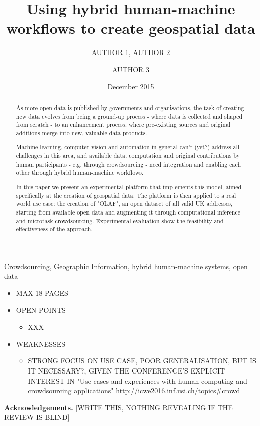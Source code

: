 \documentclass{llncs}
\title{Using hybrid human-machine workflows to create geospatial data}
\author{AUTHOR 1\inst{1}, AUTHOR 2\inst{1} \and AUTHOR 3\inst{2}}
\institute{INSTITUTE 1 \email{EMAIL FOR AUTHOR 1} \and INSTITUTE 2}
\date{December 2015}
\begin{document}
\maketitle

\begin{abstract}
As more open data is published by governments and organisations, the task of creating new data evolves from being a ground-up process - where data is collected and shaped from scratch - to an enhancement process, where pre-existing sources and original additions merge into new, valuable data products. 

Machine learning, computer vision and automation in general can't (yet?) address all challenges in this area, and available data, computation and original contributions by human participants - e.g. through crowdsourcing - need integration and enabling each other through hybrid human-machine workflows. 

In this paper we present an experimental platform that implements this model, aimed specifically at the creation of geospatial data. The platform is then applied to a real world use case: the creation of "OLAF", an open dataset of all valid UK addresses, starting from available open data and augmenting it through computational inference and microtask crowdsourcing. Experimental evaluation show the feasibility and effectiveness of the approach.
\end{abstract}

\begin{keywords}
Crowdsourcing, Geographic Information, hybrid human-machine systems, open data 
\end{keywords}

\begin{itemize}
    \item MAX 18 PAGES
    \item OPEN POINTS
        \begin{itemize}
            \item XXX
        \end{itemize}
    \item WEAKNESSES 
        \begin{itemize}
            \item STRONG FOCUS ON USE CASE, POOR GENERALISATION, BUT IS IT NECESSARY?, GIVEN THE CONFERENCE'S EXPLICIT INTEREST IN "Use cases and experiences with human computing and crowdsourcing applications" \url{http://icwe2016.inf.usi.ch/topics#crowd}
        \end{itemize}
\end{itemize}









\textbf{Acknowledgements.} [WRITE THIS, NOTHING REVEALING IF THE REVIEW IS BLIND]


\end{document}

